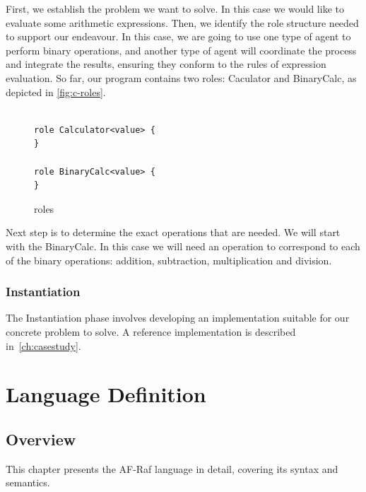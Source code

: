 \documentclass[a4paper,12pt,oneside,fleqn]{book} %
\newcommand{\todo}[1]{[\textcolor{red}{TODO}: #1]}
\begin{document}
First, we establish the problem we want to solve. In this case we would
like to evaluate some arithmetic expressions. Then, we identify the role
structure needed to support our endeavour. In this case, we are going to
use one type of agent to perform binary operations, and another type of
agent will coordinate the process and integrate the results, ensuring they
conform to the rules of expression evaluation. So far, our program contains
two roles: Caculator and BinaryCalc, as depicted in \autoref{fig:c-roles}.

\begin{figure}\footnotesize %
\begin{verbatim}

role Calculator<value> {
}

role BinaryCalc<value> {
}

\end{verbatim}
\caption{roles}
\label{fig:c-roles}
\end{figure} %

Next step is to determine the exact operations that are needed. We will
start with the BinaryCalc. In this case we will need an operation to
correspond to each of the binary operations: addition, subtraction,
multiplication and division.


\subsection{Instantiation} %
The Instantiation phase involves developing an implementation suitable for
our concrete problem to solve. A reference implementation is described
in~\autoref{ch:casestudy}.


\chapter{Language Definition}\label{ch:langdef} %


\section{Overview}\label{sec:langdef.overview} %

This chapter presents the AF-Raf language in detail, covering its syntax
and semantics.
\end{document}
